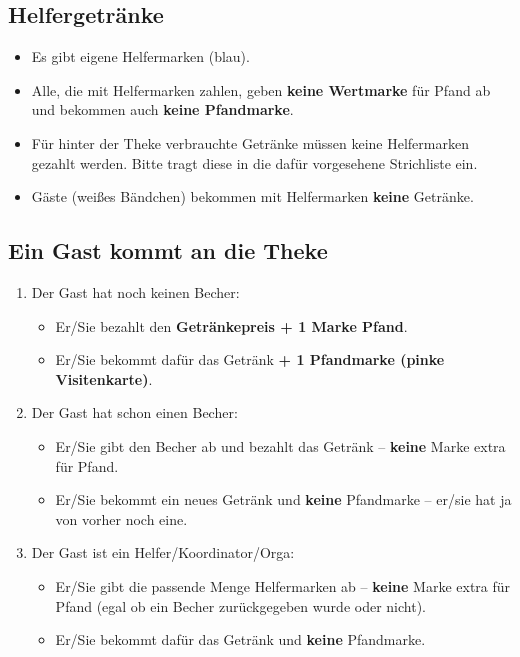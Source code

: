 \subsection{Helfergetränke}
\begin{itemize}
    \item Es gibt eigene Helfermarken (blau).
    \item Alle, die mit Helfermarken zahlen, geben \textbf{keine Wertmarke} für Pfand ab und bekommen auch \textbf{keine Pfandmarke}.
    \item Für hinter der Theke verbrauchte Getränke müssen keine Helfermarken gezahlt werden. Bitte tragt diese in die dafür vorgesehene Strichliste ein.
    \item Gäste (weißes Bändchen) bekommen mit Helfermarken \textbf{keine} Getränke.
\end{itemize}
\subsection{Ein Gast kommt an die Theke}
\begin{enumerate}
    \item Der Gast hat noch keinen Becher:
        \begin{itemize}
            \item Er/Sie bezahlt den \textbf{Getränkepreis + 1 Marke Pfand}.
            \item Er/Sie bekommt dafür das Getränk \textbf{+ 1 Pfandmarke (pinke Visitenkarte)}.
        \end{itemize}
    \item Der Gast hat schon einen Becher:
        \begin{itemize}
            \item Er/Sie gibt den Becher ab und bezahlt das Getränk -- \textbf{keine} Marke extra für Pfand.
            \item Er/Sie bekommt ein neues Getränk und \textbf{keine} Pfandmarke -- er/sie hat ja von vorher noch eine.
        \end{itemize}
    \item Der Gast ist ein Helfer/Koordinator/Orga:
        \begin{itemize}
            \item Er/Sie gibt die passende Menge Helfermarken ab -- \textbf{keine} Marke extra für Pfand (egal ob ein Becher zurückgegeben wurde oder nicht).
            \item Er/Sie bekommt dafür das Getränk und \textbf{keine} Pfandmarke.
        \end{itemize}
\end{enumerate}
